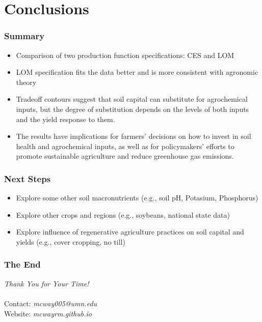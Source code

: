 \documentclass[xcolor = x11names, compress, aspectratio = 169]{beamer}
\renewcommand{\(}{\begin{columns}}
\renewcommand{\)}{\end{columns}}
\newcommand{\<}[1]{\begin{column}{#1}}
\renewcommand{\>}{\end{column}}
\begin{document}
\section{Conclusions}
    \begin{frame}[label = contributions]
    \frametitle{Summary}
        \begin{itemize}
            \item Comparison of two production function specifications: CES and LOM
            \item LOM specification fits the data better and is more consistent with agronomic theory
            \item Tradeoff contours suggest that soil capital can substitute for agrochemical inputs, but the degree of substitution depends on the levels of both inputs and the yield response to them.
            \item The results have implications for farmers' decisions on how to invest in soil health and agrochemical inputs, as well as for policymakers' efforts to promote sustainable agriculture and reduce greenhouse gas emissions.
        \end{itemize}
    \end{frame}
    \begin{frame}[label = contributions]
    \frametitle{Next Steps}
        \begin{itemize}
            \item Explore some other soil macronutrients (e.g., soil pH, Potasium, Phosphorus)
            \item Explore other crops and regions (e.g., soybeans, national state data)
            \item Explore influence of regenerative agriculture practices on soil capital and yields (e.g., cover cropping, no till)
        \end{itemize}
    \end{frame}
    \begin{frame}[label = conclusion]
    \frametitle{The End}
        \centering 
        \Large{\emph{Thank You for Your Time!}} \\
        \hspace{1.5cm} \\
        \small{Contact: \textit{mcway005@umn.edu}} \\
        \small{Website: \textit{mcwayrm.github.io}}
    \end{frame}
 
\end{document}
